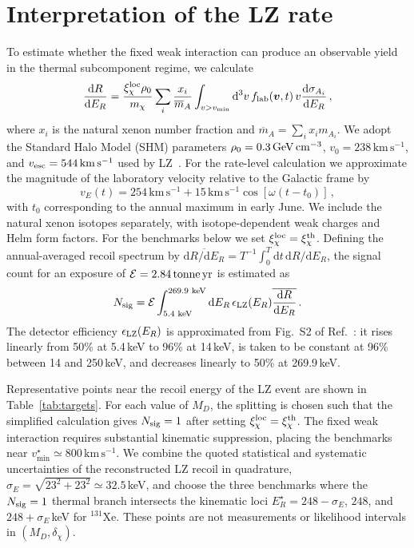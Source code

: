 \documentclass[aps,prd,reprint,preprintnumbers,superscriptaddress,nofootinbib,floatfix]{revtex4-2}
\newcommand{\dchi}{\delta_\chi}
\newcommand{\dd}{\mathrm{d}}
\newcommand{\kms}{\,\mathrm{km\,s^{-1}}}
\begin{document}
\section{Interpretation of the LZ rate}
\label{sec:rate}

To estimate whether the fixed weak interaction can produce an observable yield in the thermal subcomponent regime, we calculate
\begin{equation}
    \frac{\dd R}{\dd E_R}=\frac{\xi_\chi^{\rm loc}\rho_0}{m_\chi} \sum_i\frac{x_i}{\overline m_A}\int_{v>v_{\min}}\dd^3v\,f_{\rm lab}(\bm v,t)\,v\frac{\dd\sigma_{A_i}}{\dd E_R}\,,
    \label{eq:rate}
\end{equation}
where $x_i$ is the natural xenon number fraction and $\overline m_A=\sum_i x_im_{A_i}$. We adopt the Standard Halo Model (SHM) parameters $\rho_0=0.3{\rm\,GeV}\,\mathrm{cm}^{-3}$, $v_0=238\kms$, and $v_{\rm esc}=544\kms$ used by LZ~\cite{LZ:2026axp}. For the rate-level calculation we approximate the magnitude of the laboratory velocity relative to the Galactic frame by
\begin{equation}
    v_E(t)=254\kms+15\kms\cos[\omega(t-t_0)]\,,
    \label{eq:vEarth}
\end{equation}
with $t_0$ corresponding to the annual maximum in early June. We include the natural xenon isotopes separately, with isotope-dependent weak charges and Helm form factors. For the benchmarks below we set $\xi_\chi^{\rm loc}=\xi_\chi^{\rm th}$. Defining the annual-averaged recoil spectrum by $\overline{\dd R/\dd E_R}=T^{-1}\int_0^T\dd t\,\dd R/\dd E_R$, the signal count for an exposure of $\mathcal E=2.84\,{\rm tonne\,yr}$ is estimated as
\begin{equation}
    \label{eq:Nsig}
    N_{\rm sig} =\mathcal E \int_{5.4\,{\rm\,keV}}^{269.9\,{\rm\,keV}} \dd E_R\, \epsilon_{\rm LZ}(E_R) \overline{\frac{\dd R}{\dd E_R}}\,.
\end{equation}
The detector efficiency $\epsilon_{\rm LZ}(E_R)$ is approximated from Fig.~S2 of Ref.~\cite{LZ:2026axp}: it rises linearly from 50\% at 5.4\,keV to 96\% at 14\,keV, is taken to be constant at 96\% between 14 and 250\,keV, and decreases linearly to 50\% at 269.9\,keV.

Representative points near the recoil energy of the LZ event are shown in Table~\ref{tab:targets}. For each value of $M_D$, the splitting is chosen such that the simplified calculation gives $N_{\rm sig}=1$ after setting $\xi_\chi^{\rm loc}=\xi_\chi^{\rm th}$. The fixed weak interaction requires substantial kinematic suppression, placing the benchmarks near $v_{\min}^\star\simeq800\kms$. We combine the quoted statistical and systematic uncertainties of the reconstructed LZ recoil in quadrature, $\sigma_E=\sqrt{23^2+23^2}\simeq32.5$\,keV, and choose the three benchmarks where the $N_{\rm sig}=1$ thermal branch intersects the kinematic loci $E_R^\star=248-\sigma_E$, $248$, and $248+\sigma_E$\,keV for $^{131}$Xe. These points are not measurements or likelihood intervals in $(M_D,\dchi)$.
\end{document}

